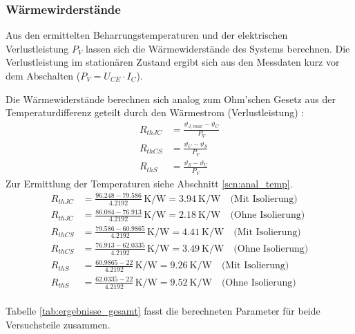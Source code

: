 \subsubsection{Wärmewirderstände}

Aus den ermittelten Beharrungstemperaturen und der elektrischen Verlustleistung $P_V$ lassen sich die Wärmewiderstände des Systems berechnen. Die Verlustleistung im stationären Zustand ergibt sich aus den Messdaten kurz vor dem Abschalten ($P_V = U_{CE} \cdot I_C$).

Die Wärmewiderstände berechnen sich analog zum Ohm'schen Gesetz aus der Temperaturdifferenz geteilt durch den Wärmestrom (Verlustleistung) :
\begin{align}
    R_{thJC} & = \frac{\vartheta_{J,max} - \vartheta_C}{P_V} \label{eq:RthJC} \\
    R_{thCS} & = \frac{\vartheta_C - \vartheta_S}{P_V} \label{eq:RthCS}       \\
    R_{thS}  & = \frac{\vartheta_S - \vartheta_U}{P_V} \label{eq:RthS}
\end{align}
Zur Ermittlung der Temperaturen siehe Abschnitt \ref{scn:anal_temp}.
\begin{align}
    R_{thJC} & = \frac{96.248 - 79.586}{4.2192} \, \si{\kelvin\per\watt} = \boxed{\SI{3.94}{\kelvin\per\watt}} \quad \text{(Mit Isolierung)} \\
    R_{thJC} & = \frac{86.084 - 76.913}{4.2192} \, \si{\kelvin\per\watt} = \boxed{\SI{2.18}{\kelvin\per\watt}} \quad \text{(Ohne Isolierung)} \\
    R_{thCS} & = \frac{79.586 - 60.9865}{4.2192} \, \si{\kelvin\per\watt} = \boxed{\SI{4.41}{\kelvin\per\watt}} \quad \text{(Mit Isolierung)} \\
    R_{thCS} & = \frac{76.913 - 62.0335}{4.2192} \, \si{\kelvin\per\watt} = \boxed{\SI{3.49}{\kelvin\per\watt}} \quad \text{(Ohne Isolierung)} \\
    R_{thS}  & = \frac{60.9865 - 22}{4.2192} \, \si{\kelvin\per\watt} = \boxed{\SI{9.26}{\kelvin\per\watt}} \quad \text{(Mit Isolierung)} \\
    R_{thS}  & = \frac{62.0335 - 22}{4.2192} \, \si{\kelvin\per\watt} = \boxed{\SI{9.52}{\kelvin\per\watt}} \quad \text{(Ohne Isolierung)}
\end{align}
\\
Tabelle \ref{tab:ergebnisse_gesamt} fasst die berechneten Parameter für beide Versuchsteile zusammen.

